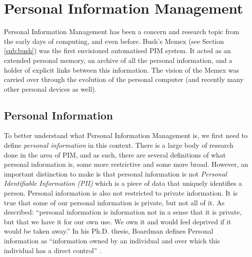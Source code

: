 \section{Personal Information Management}
\label{sec:pim}

Personal Information Management has been a concern and research topic from the early days of computing, and even before. Bush's Memex (see Section \ref{sub:bush}) was the first envisioned automatised PIM system. It acted as an extended personal memory, an archive of all the personal information, and a holder of explicit links between this information. The vision of the Memex was carried over through the evolution of the personal computer  (and recently many other personal devices as well). 

\subsection{Personal Information}
\label{sub:pi}

To better understand what Personal Information Management is, we first need to define \emph{personal information} in this context. There is a large body of research done in the area of PIM, and as such, there are several definitions of what personal information is, some more restrictive and some more broad. However, an important distinction to make is that personal information is not \emph{Personal Identifiable Information (PII)} which is a piece of data that uniquely identifies a person. Personal information is also not restricted to private information. It is true that some of our personal information is private, but not all of it. As \cite{Lansdale1988} described: ``personal information is information not in a sense that it is private, but that we have it for our own use. We own it and would feel deprived if it would be taken away.'' In his Ph.D. thesis, Boardman defines Personal information as ``information owned by an individual and over which this individual has a direct control'' \cite{
Boardman2004PhD}.

